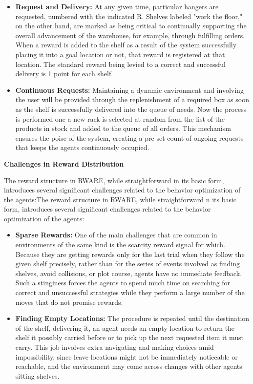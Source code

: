 \documentclass[11pt]{article}
\begin{document}
\begin{itemize}
\item \textbf{Request and Delivery:} At any given time, particular hangers are requested, numbered with the indicated R. Shelves labeled "work the floor," on the other hand, are marked as being critical to continually supporting the overall advancement of the warehouse, for example, through fulfilling orders. When a reward is added to the shelf as a result of the system successfully placing it into a goal location or not, that reward is registered at that location. The standard reward being levied to a correct and successful delivery is 1 point for each shelf.


\item \textbf{Continuous Requests:} Maintaining a dynamic environment and involving the user will be provided through the replenishment of a required box as soon as the shelf is successfully delivered into the queue of needs. Now the process is performed one a new rack is selected at random from the list of the products in stock and added to the queue of all orders. This mechanism ensures the poise of the system, creating a pre-set count of ongoing requests that keeps the agents continuously occupied.
\end{itemize}


\textbf{Challenges in Reward Distribution}

The reward structure in RWARE, while straightforward in its basic form, introduces several significant challenges related to the behavior optimization of the agents:The reward structure in RWARE, while straightforward n its basic form, introduces several significant challenges related to the behavior optimization of the agents:

\begin{itemize}
\item \textbf{Sparse Rewards:} One of the main challenges that are common in environments of the same kind is the scarcity reward signal for which. Because they are getting rewards only for the last trial when they follow the given shelf precisely, rather than for the series of events involved as finding shelves, avoid collisions, or plot course, agents have no immediate feedback. Such a stinginess forces the agents to spend much time on searching for correct and unsuccessful strategies while they perform a large number of the moves that do not promise rewards.

\item \textbf{Finding Empty Locations:} The procedure is repeated until the destination of the shelf, delivering it, an agent needs an empty location to return the shelf it possibly carried before or to pick up the next requested item it must carry. This job involves extra navigating and making choices amid impossibility, since leave locations might not be immediately noticeable or reachable, and the environment may come across changes with other agents sitting shelves.

\end{itemize}
\end{document}
